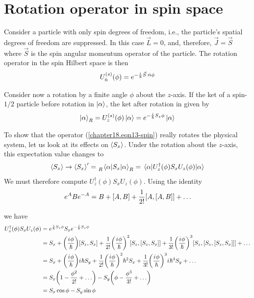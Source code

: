 \section{Rotation operator in spin space}
\label{chapter28.sect.rotation-in-spin-space}
Consider a particle with only spin degrees of freedom, i.e., the particle's spatial degrees of freedom are suppressed. In this case $\vec{L} = 0$, and, therefore, $\vec{J}=\vec{S}$ where $\vec{S}$ is the spin angular momentum operator of the particle. The rotation operator in the spin Hilbert space is then 
\begin{equation}
\label{chapter18.eqn13-spin}
U^{(s)}_{\hat{n}}\qty(\phi) = e^{- \frac{{i\mkern1mu}}{\hbar} \vec{S}\cdot\hat{n} \phi}
\end{equation}

Consider now a rotation by a finite angle $\phi$ about the $z$-axis. If the ket of a spin-$1/2$ particle before rotation in $\ket{\alpha}$, the ket after rotation in given by
\begin{equation}
\label{chapter18.eqn14-spin}
\ket{\alpha}_R = U^{(s)}_{z}\qty(\phi) \ket{\alpha} = e^{- \frac{{i\mkern1mu}}{\hbar} S_z \phi} \ket{\alpha}
\end{equation}

To show that the operator (\ref{chapter18.eqn13-spin}) really rotates the physical system, let us look at its effects on $\expval{S_x}$. Under the rotation about the $z$-axis, this expectation value changes to
\begin{equation}
\expval{S_x} \rightarrow \expval{S_x}^\prime = \tensor[_R]{\mel{\alpha}{S_x}{\alpha}}{_R} = \mel{\alpha}{U^{\dagger}_z(\phi) S_x U_z(\phi)}{\alpha}
\end{equation}
We must therefore compute $U^{\dagger}_z(\phi) S_x U_z(\phi)$. Using the identity
\begin{equation}
e^{A} B e^{-A} = B + \comm{A}{B} + \frac{1}{2 !} \comm{A}{\comm{A}{B}} + \ldots
\end{equation}

we have
\begin{align*}
U^{\dagger}_z(\phi) S_x U_z(\phi) 
&= e^{ \frac{\iu}{\hbar} S_z \phi} S_x e^{- \frac{\iu}{\hbar} S_z \phi} \\
&= S_x + \qty(\frac{\iu \phi}{\hbar}) \comm{S_z}{S_x} + \frac{1}{2 !} \qty(\frac{\iu \phi}{\hbar})^2 \comm{S_z}{\comm{S_z}{S_x}} + \frac{1 }{3 !} \qty(\frac{\iu \phi}{\hbar})^3 \comm{S_z}{\comm{S_z}{\comm{S_z}{S_x}}}  + \ldots \\
&= S_x + \qty(\frac{\iu \phi}{\hbar}) \iu \hbar S_y + \frac{1}{2 !} \qty(\frac{\iu \phi}{\hbar})^2 \hbar^2 S_x + \frac{1}{3 !} \qty(\frac{\iu \phi}{\hbar})^3 \iu \hbar^3 S_y + \ldots \\
&= S_x \qty(1 - \frac{\phi^2}{2 !} + \ldots)  - S_y \qty(\phi - \frac{\phi^3}{3 !} + \ldots) \\
&= S_x \cos\phi - S_y \sin\phi
\end{align*}

